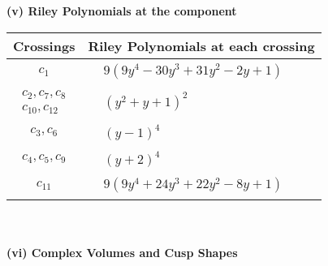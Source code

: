 \documentclass[1p]{elsarticle_modified}
\theoremstyle{definition}
\begin{document}
\newpage\renewcommand{\arraystretch}{1}
\flushleft \textbf{(v) Riley Polynomials at the component}\newline \\
\begin{tabular}{m{50pt}|m{274pt}}
Crossings & \hspace{64pt}Riley Polynomials at each crossing \\
\hline $$\begin{aligned}c_{1}\end{aligned}$$&$\begin{aligned}
&9(9 y^4-30 y^3+31 y^2-2 y+1)
\end{aligned}$\\
\hline $$\begin{aligned}c_{2},c_{7},c_{8}\\c_{10},c_{12}\end{aligned}$$&$\begin{aligned}
&(y^2+y+1)^2
\end{aligned}$\\
\hline $$\begin{aligned}c_{3},c_{6}\end{aligned}$$&$\begin{aligned}
&(y-1)^4
\end{aligned}$\\
\hline $$\begin{aligned}c_{4},c_{5},c_{9}\end{aligned}$$&$\begin{aligned}
&(y+2)^4
\end{aligned}$\\
\hline $$\begin{aligned}c_{11}\end{aligned}$$&$\begin{aligned}
&9(9 y^4+24 y^3+22 y^2-8 y+1)
\end{aligned}$\\
\hline
\end{tabular}\\~\\
\newpage\flushleft \textbf{(vi) Complex Volumes and Cusp Shapes}
\end{document}
